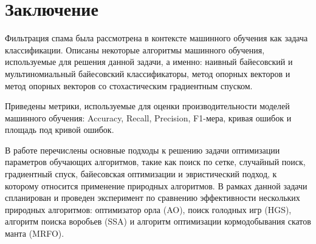 \chapter*{Заключение}

Фильтрация спама была рассмотрена в контексте машинного обучения как задача
классификации. Описаны некоторые алгоритмы машинного обучения, используемые 
для решения данной задачи, а именно: наивный байесовский и мультиномиальный байесовский 
классификаторы, метод опорных векторов и метод опорных векторов со стохастическим градиентным спуском. 

Приведены метрики, используемые для оценки производительности
моделей машинного обучения: Accuracy, Recall, Precision, F1-мера, кривая ошибок и площадь под кривой ошибок. 

В работе перечислены основные подходы к решению задачи оптимизации параметров
обучающих алгоритмов, такие как поиск по сетке, случайный поиск, градиентный спуск, байесовская 
оптимизации и эвристический подход, к которому относится применение природных алгоритмов.
В рамках данной задачи спланирован и проведен эксперимент по сравнению 
эффективности нескольких природных алгоритмов: оптимизатор орла (AO), поиск голодных игр (HGS), алгоритм поиска 
воробьев (SSA) и алгоритм оптимизации кормодобывания скатов манта (MRFO).

